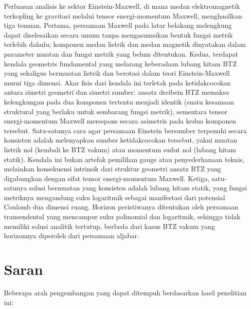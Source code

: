 Perluasan analisis ke sektor Einstein-Maxwell, di mana medan elektromagnetik terkopling ke gravitasi melalui tensor energi-momentum Maxwell, menghasilkan tiga temuan. Pertama, persamaan Maxwell pada latar belakang melengkung dapat diselesaikan secara umum tanpa mengasumsikan bentuk fungsi metrik terlebih dahulu; komponen medan listrik dan medan magnetik dinyatakan dalam parameter muatan dan fungsi metrik yang belum ditentukan. Kedua, terdapat kendala geometris fundamental yang melarang keberadaan lubang hitam BTZ yang sekaligus bermuatan listrik dan berotasi dalam teori Einstein-Maxwell murni tiga dimensi. Akar fisis dari kendala ini terletak pada ketidakcocokan antara simetri geometri dan simetri sumber: ansatz dreibein BTZ memaksa kelengkungan pada dua komponen tertentu menjadi identik (suatu kesamaan struktural yang berlaku untuk sembarang fungsi metrik), sementara tensor energi-momentum Maxwell merespons secara asimetris pada kedua komponen tersebut. Satu-satunya cara agar persamaan Einstein bersumber terpenuhi secara konsisten adalah melenyapkan sumber ketidakcocokan tersebut, yakni muatan listrik nol (kembali ke BTZ vakum) atau momentum sudut nol (lubang hitam statik). Kendala ini bukan artefak pemilihan gauge atau penyederhanaan teknis, melainkan konsekuensi intrinsik dari struktur geometri ansatz BTZ yang digabungkan dengan sifat tensor energi-momentum Maxwell. Ketiga, satu-satunya solusi bermuatan yang konsisten adalah lubang hitam statik, yang fungsi metriknya mengandung suku logaritmik sebagai manifestasi dari potensial Coulomb dua dimensi ruang. Horizon peristiwanya ditentukan oleh persamaan transendental yang mencampur suku polinomial dan logaritmik, sehingga tidak memiliki solusi analitik tertutup, berbeda dari kasus BTZ vakum yang horizonnya diperoleh dari persamaan aljabar.


\section{Saran}

Beberapa arah pengembangan yang dapat ditempuh berdasarkan hasil penelitian ini:

